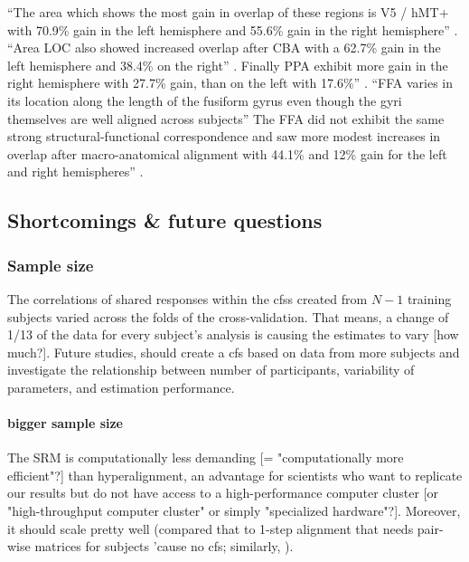 %
``The area which shows the most gain in overlap of these regions is V5 / hMT+
with 70.9\% gain in the left hemisphere and 55.6\% gain in the right
hemisphere'' \citep{frost2012measuring}.
%
``Area LOC also showed increased overlap after CBA with a 62.7\% gain in the
left hemisphere and 38.4\% on the right'' \citep{frost2012measuring}.
%
Finally PPA exhibit more gain in the right hemisphere with 27.7\% gain, than on
the left with 17.6\%'' \citep{frost2012measuring}.
%
``FFA varies in its location along the length of the fusiform gyrus even though
the gyri themselves are well aligned across subjects''
%
The FFA did not exhibit the same strong structural-functional correspondence and
saw more modest increases in overlap after macro-anatomical alignment with
44.1\% and 12\% gain for the left and right hemispheres''
\citep{frost2012measuring}.



\subsection{Shortcomings \& future questions}

\subsubsection{Sample size}



The correlations of shared responses within the \acp{cfs} created from $N-1$
training subjects varied across the folds of the cross-validation.
That means, a change of 1/13 of the data for every subject's analysis is causing
the estimates to vary [how much?].
Future studies, should create a \ac{cfs} based on data from more subjects and
investigate the relationship between number of participants, variability of
parameters, and estimation performance.

\paragraph{bigger sample size}

%
The SRM is computationally less demanding [= "computationally more efficient"?]
than hyperalignment, an advantage for scientists who want to replicate our
results but do not have access to a high-performance computer cluster [or
"high-throughput computer cluster" or simply "specialized hardware"?].
%
Moreover, it should scale pretty well (compared that to
\citep{jiahui2020predicting} 1-step alignment that needs pair-wise matrices for
subjects 'cause no \ac{cfs}; similarly, \citep{busch2021hybrid}).


